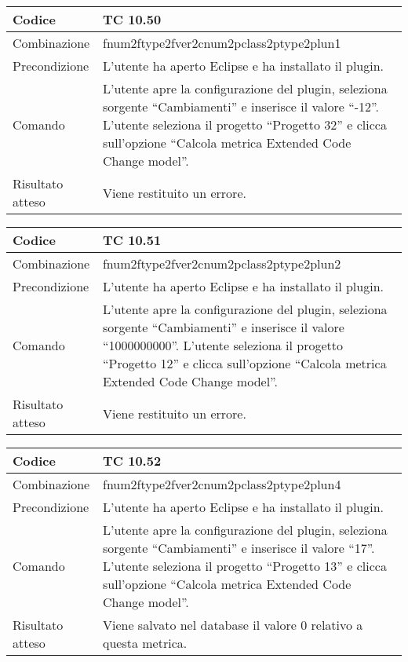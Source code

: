 \begin{table}[ht]
\begin{tabular}{|p{3cm}|p{9cm}|}
\hline
\cellcolor{lightgray}Codice				& TC 10.50								\\
\hline
\cellcolor{lightgray}Combinazione		& fnum2ftype2fver2cnum2pclass2ptype2plun1									\\
\hline
\cellcolor{lightgray}Precondizione		& L'utente ha aperto Eclipse e ha installato il plugin.		\\
\hline
\cellcolor{lightgray}Comando			& L'utente apre la configurazione del plugin, seleziona sorgente ``Cambiamenti'' e inserisce il valore ``-12''. L'utente seleziona il progetto ``Progetto 32''  e clicca sull'opzione ``Calcola metrica Extended Code Change model''.	\\
\hline
\cellcolor{lightgray}Risultato atteso	& Viene restituito un errore.\\
\hline
\end{tabular}
\end{table}

\begin{table}[ht]
\begin{tabular}{|p{3cm}|p{9cm}|}
\hline
\cellcolor{lightgray}Codice				& TC 10.51								\\
\hline
\cellcolor{lightgray}Combinazione		& fnum2ftype2fver2cnum2pclass2ptype2plun2									\\
\hline
\cellcolor{lightgray}Precondizione		& L'utente ha aperto Eclipse e ha installato il plugin.		\\
\hline
\cellcolor{lightgray}Comando			& L'utente apre la configurazione del plugin, seleziona sorgente ``Cambiamenti'' e inserisce il valore ``1000000000''. L'utente seleziona il progetto ``Progetto 12''  e clicca sull'opzione ``Calcola metrica Extended Code Change model''.	\\
\hline
\cellcolor{lightgray}Risultato atteso	& Viene restituito un errore.\\
\hline
\end{tabular}
\end{table}

\begin{table}[ht]
\begin{tabular}{|p{3cm}|p{9cm}|}
\hline
\cellcolor{lightgray}Codice				& TC 10.52								\\
\hline
\cellcolor{lightgray}Combinazione		& fnum2ftype2fver2cnum2pclass2ptype2plun4									\\
\hline
\cellcolor{lightgray}Precondizione		& L'utente ha aperto Eclipse e ha installato il plugin.		\\
\hline
\cellcolor{lightgray}Comando			& L'utente apre la configurazione del plugin, seleziona sorgente ``Cambiamenti'' e inserisce il valore ``17''. L'utente seleziona il progetto ``Progetto 13''  e clicca sull'opzione ``Calcola metrica Extended Code Change model''.	\\
\hline
\cellcolor{lightgray}Risultato atteso	& Viene salvato nel database il valore 0 relativo a questa metrica.\\
\hline
\end{tabular}
\end{table}

